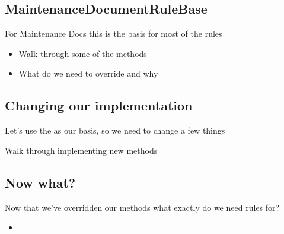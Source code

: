 \begin{ifhtml}
    \begin{s5slide}
        \section{MaintenanceDocumentRuleBase}
            For Maintenance Docs this is the basis for most of the rules
            \begin{s5notes}
                \begin{itemize}
                    \item Walk through some of the methods
                    \item What do we need to override and why
                \end{itemize}
            \end{s5notes}
    \end{s5slide}
    \begin{s5slide}
        \section{Changing our implementation}
            Let's use the  as our basis, so we need to change a few things
            \begin{s5notes}
                Walk through implementing new methods
            \end{s5notes}
    \end{s5slide}
    \begin{s5slide}
        \section{Now what?}
            Now that we've overridden our methods what exactly do we need rules for?
            \begin{itemize}
                \item 
            \end{itemize}
    \end{s5slide}
    \begin{s5slide}
        \section{}
            
    \end{s5slide}
\end{ifhtml}